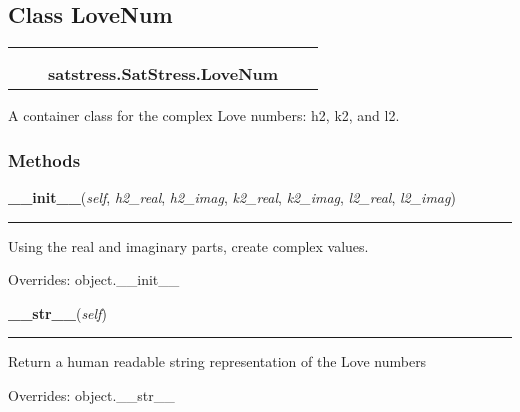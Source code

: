 \subsection{Class LoveNum}

    \label{satstress:SatStress:LoveNum}
\begin{tabular}{cccccc}
\multicolumn{2}{r}{\settowidth{\BCL}{object}\multirow{2}{\BCL}{object}}
&&
  \\\cline{3-3}
  &&\multicolumn{1}{c|}{}
&&
  \\
&&\multicolumn{2}{l}{\textbf{satstress.SatStress.LoveNum}}
\end{tabular}

A container class for the complex Love numbers: h2, k2, and l2.



  \subsubsection{Methods}

    \vspace{0.5ex}

\hspace{.8\funcindent}\begin{boxedminipage}{\funcwidth}

    \raggedright \textbf{\_\_init\_\_}(\textit{self}, \textit{h2\_real}, \textit{h2\_imag}, \textit{k2\_real}, \textit{k2\_imag}, \textit{l2\_real}, \textit{l2\_imag})

    \vspace{-1.5ex}

    \rule{\textwidth}{0.5\fboxrule}
\setlength{\parskip}{2ex}
    Using the real and imaginary parts, create complex values.

\setlength{\parskip}{1ex}
      Overrides: object.\_\_init\_\_

    \end{boxedminipage}

    \vspace{0.5ex}

\hspace{.8\funcindent}\begin{boxedminipage}{\funcwidth}

    \raggedright \textbf{\_\_str\_\_}(\textit{self})

    \vspace{-1.5ex}

    \rule{\textwidth}{0.5\fboxrule}
\setlength{\parskip}{2ex}
    Return a human readable string representation of the Love numbers

\setlength{\parskip}{1ex}
      Overrides: object.\_\_str\_\_

    \end{boxedminipage}


